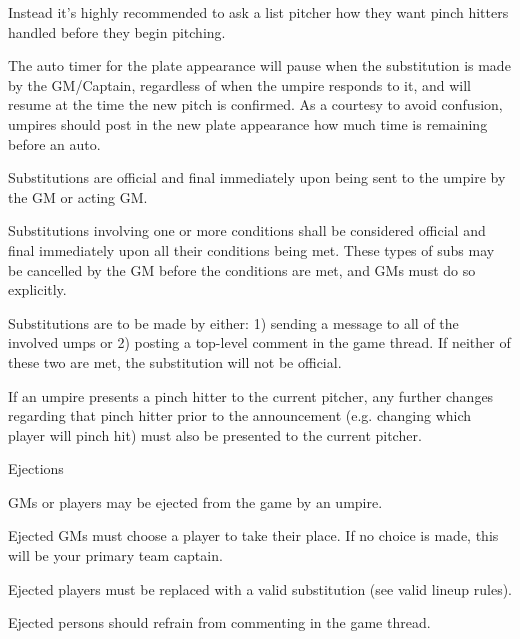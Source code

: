 \begin{deepEnumerate}
\begin{deepEnumerate}
\begin{deepEnumerate}
			Instead it’s highly recommended to ask a list pitcher how they want pinch hitters handled before they begin pitching.
			\item The auto timer for the plate appearance will pause when the substitution is made by the GM/Captain, 
			regardless of when the umpire responds to it, 
			and will resume at the time the new pitch is confirmed. 
			As a courtesy to avoid confusion, 
			umpires should post in the new plate appearance how much time is remaining before an auto.
		\end{deepEnumerate}
		\item Substitutions are official and final immediately upon being sent to the umpire by the GM or acting GM.
		\begin{deepEnumerate}
			\item Substitutions involving one or more conditions shall be considered official and final immediately upon all their conditions being met. These types of subs may be cancelled by the GM before the conditions are met, and GMs must do so explicitly.
			\item Substitutions are to be made by either: 1) sending a message to all of the involved umps or 2) posting a top-level comment in the game thread. If neither of these two are met, the substitution will not be official.
			\item If an umpire presents a pinch hitter to the current pitcher, 
			any further changes regarding that pinch hitter prior to the announcement 
			(e.g. changing which player will pinch hit) 
			must also be presented to the current pitcher.
		\end{deepEnumerate}
	\end{deepEnumerate}
	\item Ejections
	\begin{deepEnumerate}
		\item GMs or players may be ejected from the game by an umpire.
		\begin{deepEnumerate}
			\item Ejected GMs must choose a player to take their place. If no choice is made, this will be your primary team captain.
			\item Ejected players must be replaced with a valid substitution (see valid lineup rules).
			\item Ejected persons should refrain from commenting in the game thread.
		\end{deepEnumerate}
	\end{deepEnumerate}
\end{deepEnumerate}
